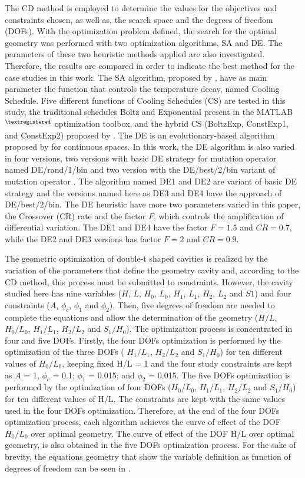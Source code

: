 \documentclass[12pt,fleqn]{article}
\begin{document}
The CD method is employed to determine the values for the  objectives and constraints chosen, as well as, the search space and the degrees of freedom (DOFs). With the optimization problem defined, the search for the optimal geometry was performed with two optimization algorithms, SA and DE. The parameters of these two heuristic methods applied are also investigated. Therefore, the results are compared in order to indicate the best method for the case studies in this work. The SA algorithm, proposed by \cite{Kirkpatrick1983}, have as main parameter the function that controls the temperature decay, named Cooling Schedule. Five different functions of Cooling Schedules (CS) are tested in this study, the traditional schedules Boltz and Exponential present in the MATLAB$^{\tiny ®}$ optimization toolbox, and the hybrid CS (BoltzExp, ConstExp1, and ConstExp2) proposed by \cite{Gonzales2015b, Gonzales2015}. The DE is an evolutionary-based algorithm proposed by \cite{Storn1997} for continuous spaces. In this work, the DE algorithm is also varied in four versions, two versions with basic DE strategy for mutation operator named DE/rand/1/bin and two version with the DE/best/2/bin variant of mutation operator \citep{Storn1997}. The algorithm named DE1 and DE2 are variant of basic DE strategy and the versions named here as DE3 and DE4 have the approach of  DE/best/2/bin. The DE heuristic have more two parameters varied in this paper, the Crossover (CR) rate and the factor $F$, which controls the amplification of differential variation. The DE1 and DE4 have the factor $F=1.5$ and $CR=0.7$, while the DE2 and DE3 versions has factor $F=2$ and $CR=0.9$.

The geometric optimization of double-t shaped cavities is realized by the variation of the parameters that define the geometry cavity and, according to the CD method, this process must be submitted to constraints. However, the cavity studied here has nine variables ($H$, $L$, $H_{0}$, $L_{0}$, $H_{1}$, $L_{1}$, $H_{2}$, $L_{2}$ and $S1$) and four constraints ($A$, $\phi_{c}$, $\phi_{1}$ and $\phi_{2}$). Then, five degrees of freedom are needed to complete the equations and allow the determination of the geometry ($H/L$, $H_{0}/L_{0}$, $H_{1}/L_{1}$, $H_{2}/L_{2}$ and $S_{1}/H_{0}$). The optimization process is concentrated in four and five DOFs. Firstly, the four DOFs optimization is performed by the optimization of the three DOFs ( $H_{1}/L_{1}$, $H_{2}/L_{2}$ and $S_{1}/H_{0}$) for ten different values of $H_{0}/L_{0}$,  keeping fixed  H/L = 1 and the four study constraints are kept as $A$ = 1, $\phi_{c}$ = 0.1; $\phi_{1}$ = 0.015; and $\phi_{2}$ = 0.015. The five DOFs optimization is performed by the optimization of four DOFs ($H_{0}/L_{0}$, $H_{1}/L_{1}$, $H_{2}/L_{2}$ and $S_{1}/H_{0}$) for ten different values of H/L.  The constraints are kept with the same values used in the four  DOFs optimization. Therefore, at the end of the four  DOFs optimization process, each algorithm achieves the curve of effect of the DOF  $H_{0}/L_{0}$ over optimal geometry. The curve of effect of the DOF H/L over optimal geometry, is also obtained in the five DOFs optimization process. For the sake of brevity, the equations geometry that show the variable definition as function of degrees of freedom can be seen in \cite{Gonzales2015b}.
\end{document}
